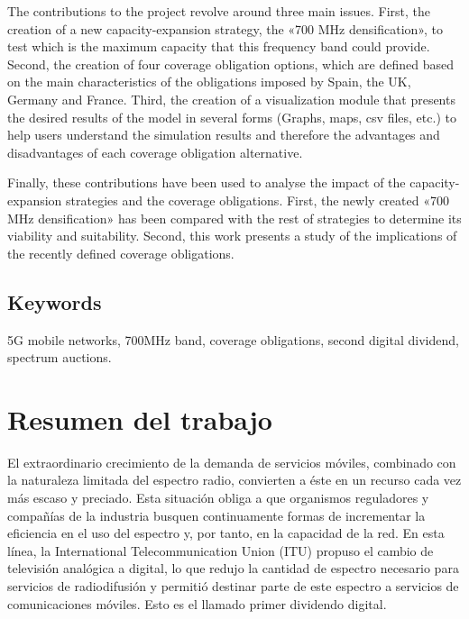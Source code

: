 The contributions to the project revolve around three main issues. First, the creation of a new capacity-expansion strategy, the «700 MHz densification», to test which is the maximum capacity that this frequency band could provide. Second, the creation of four coverage obligation options, which are defined based on the main characteristics of the obligations imposed by Spain, the UK, Germany and France. Third, the creation of a visualization module that presents the desired results of the model in several forms (Graphs, maps, csv files, etc.) to help users understand the simulation results and therefore the advantages and disadvantages of each coverage obligation alternative.\par

Finally, these contributions have been used to analyse the impact of the capacity-expansion strategies and the coverage obligations. First, the newly created «700 MHz densification» has been compared with the rest of strategies to determine its viability and suitability. Second, this work presents a study of the implications of the recently defined coverage obligations.\par

\section*{Keywords}
5G mobile networks, 700MHz band, coverage obligations, second digital dividend, spectrum auctions. 





\chapter{Resumen del trabajo}

El extraordinario crecimiento de la demanda de servicios móviles, combinado con la naturaleza limitada del espectro radio, convierten a éste en un recurso cada vez más escaso y preciado. Esta situación obliga a que organismos reguladores y compañías de la industria busquen continuamente formas de incrementar la eficiencia en el uso del espectro y, por tanto, en la capacidad de la red. En esta línea, la International Telecommunication Union (ITU) propuso el cambio de televisión analógica a digital, lo que redujo la cantidad de espectro necesario para servicios de radiodifusión y permitió destinar parte de este espectro a servicios de comunicaciones móviles. Esto es el llamado primer dividendo digital.\par

